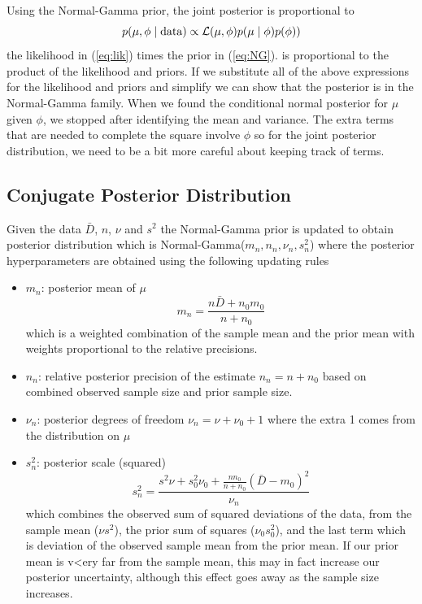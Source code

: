 \documentclass[11pt]{article}
\def\data{\text{data}}
\begin{document}
Using the Normal-Gamma prior, the joint posterior is proportional to
$$
p(\mu, \phi \mid \data) \propto {\cal{L}}(\mu, \phi) p(\mu \mid \phi) p(\phi)
)
$$
the likelihood in (\ref{eq:lik}) times the prior in (\ref{eq:NG}).
is proportional to the product of the likelihood and priors.
If we substitute all of the above expressions for the likelihood and priors and simplify we can show that the posterior is in the Normal-Gamma family.  When we found the conditional normal posterior for $\mu$ given $\phi$, we stopped after identifying the mean and variance.  The extra terms that are needed to complete the square involve $\phi$ so for the joint posterior distribution, we need to be a bit more careful about keeping track of terms.  



\subsection*{Conjugate Posterior Distribution}
Given the data $\bar{D}$, $n$, $\nu$ and $s^2$ the Normal-Gamma prior is updated to obtain posterior distribution which is Normal-Gamma($m_n, n_n, \nu_n, s^2_n$) where the posterior hyperparameters are obtained using the following updating rules
\begin{itemize}
\item $m_n$: posterior mean of $\mu$  
$$m_n = \frac{n \bar{D} + n_0 m_0}{n + n_0}$$
which is a weighted combination of the sample mean and the prior mean with weights proportional to the relative precisions.
\item $n_n$:  relative posterior precision of the estimate $n_n = n + n_0$  based on combined observed sample size and prior sample size.
\item $\nu_n$: posterior degrees of freedom $\nu_n = \nu + \nu_0 + 1$ where the extra 1 comes from the distribution on $\mu$
\item $s^2_n$: posterior scale (squared)  
$$ s^2_n = \frac{ s^2 \nu + s^2_0 \nu_0 +  \frac{n n_0} {n + n_0} (\bar{D} - m_0)^2}{\nu_n} $$
which combines the observed sum of squared deviations of the data,  from the sample mean ($\nu s^2$), the prior sum of squares ($\nu_0 s^2_0$), and the last term which is deviation of the observed sample mean from the prior mean. If our   prior mean is v<ery far from the sample mean, this may in fact increase our posterior uncertainty, although this effect goes away as the sample size increases.
\end{itemize}
\end{document}
